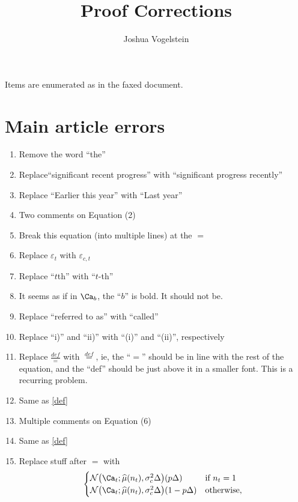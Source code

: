  
\title{Proof Corrections}
\author{Joshua Vogelstein}


\maketitle
Items are enumerated as in the faxed document.

\section{Main article errors}

\begin{enumerate}
\item Remove the word ``the''
\item Replace``significant recent progress'' with ``significant progress recently''
\item Replace ``Earlier this year'' with ``Last year''
\item Two comments on Equation (2)
\ita 
\item Break this equation (into multiple lines) at the $=$ 
\item Replace $\varepsilon_t$ with $\varepsilon_{c,t}$
\itb
\item Replace ``$t$th'' with ``$t$-th''
\item It seems as if in $\Ca_b$, the ``$b$'' is bold.  It should not be.
\item Replace ``referred to as'' with ``called''
\item Replace ``i)'' and ``ii)'' with ``(i)'' and ``(ii)'', respectively 
\item Replace $\frac{def}{=}$ with $\overset{def}{=}$, ie, the ``$=$'' should be in line with the rest of the equation, and the ``def'' should be just above it in a smaller font.  This is a recurring problem.  \label{def}
\item Same as \ref{def}
\item Multiple comments on Equation (6)
\ita
\item Same as \ref{def}
\item Replace stuff after $=$ with
\begin{align*}
\begin{cases}
\mathcal{N}\big(\Ca_t; \widehat{\mu}(n_t), \sigma_c^2 \Delta\big) (p \Delta)& \text{if } n_t=1 \\
\mathcal{N}\big(\Ca_t; \widehat{\mu}(n_t), \sigma_c^2 \Delta\big) (1-p \Delta)& \text{otherwise,}\\
\end{cases}

\end{align*}
\end{enumerate}
